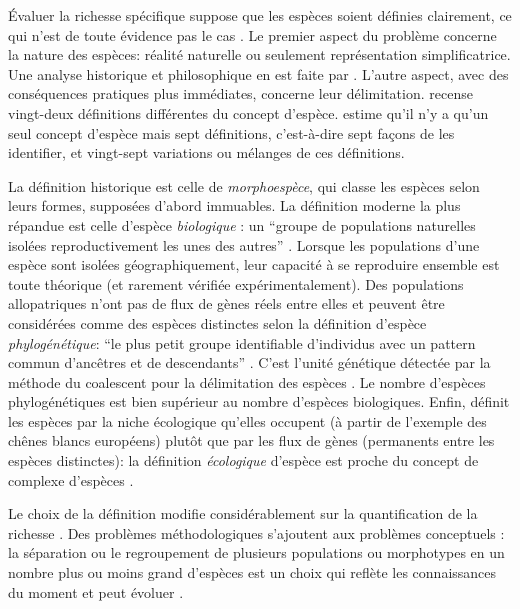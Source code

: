\documentclass[
  11pt,
  french,
  a4paper,
  extrafontsizes,onecolumn,openright
  ]{memoir}
\begin{document}
Évaluer la richesse spécifique suppose que les espèces soient définies clairement, ce qui n'est de toute évidence pas le cas \autocite{Casetta2014}.
Le premier aspect du problème concerne la nature des espèces: réalité naturelle ou seulement représentation simplificatrice.
Une analyse historique et philosophique en est faite par \textcite{Richards2010}.
L'autre aspect, avec des conséquences pratiques plus immédiates, concerne leur délimitation.
\textcite{Mayden1997} recense vingt-deux définitions différentes du concept d'espèce.
\textcite{Wilkins2011} estime qu'il n'y a qu'un seul concept d'espèce mais sept définitions, c'est-à-dire sept façons de les identifier, et vingt-sept variations ou mélanges de ces définitions.

La définition historique est celle de \emph{morphoespèce}, qui classe les espèces selon leurs formes, supposées d'abord immuables.
La définition moderne la plus répandue est celle d'espèce \emph{biologique} \autocite{Dobzhansky1937}: un ``groupe de populations naturelles isolées reproductivement les unes des autres'' \autocite{Mayr1942}.
Lorsque les populations d'une espèce sont isolées géographiquement, leur capacité à se reproduire ensemble est toute théorique (et rarement vérifiée expérimentalement).
Des populations allopatriques n'ont pas de flux de gènes réels entre elles et peuvent être considérées comme des espèces distinctes selon la définition d'espèce \emph{phylogénétique}: ``le plus petit groupe identifiable d'individus avec un pattern commun d'ancêtres et de descendants'' \autocite{Cracraft1983}.
C'est l'unité génétique détectée par la méthode du coalescent pour la délimitation des espèces \autocite{Sukumaran2017}.
Le nombre d'espèces phylogénétiques est bien supérieur au nombre d'espèces biologiques.
Enfin, \textcite{VanValen1976} définit les espèces par la niche écologique qu'elles occupent (à partir de l'exemple des chênes blancs européens) plutôt que par les flux de gènes (permanents entre les espèces distinctes): la définition \emph{écologique} d'espèce est proche du concept de complexe d'espèces \autocite[ensemble d'espèces voisines échangeant des gènes,][]{Pernes1984}.

Le choix de la définition modifie considérablement sur la quantification de la richesse \autocite{Agapow2004}.
Des problèmes méthodologiques s'ajoutent aux problèmes conceptuels \autocite{Hey2001}: la séparation ou le regroupement de plusieurs populations ou morphotypes en un nombre plus ou moins grand d'espèces est un choix qui reflète les connaissances du moment et peut évoluer \autocite{Barberousse2014}.
\end{document}
